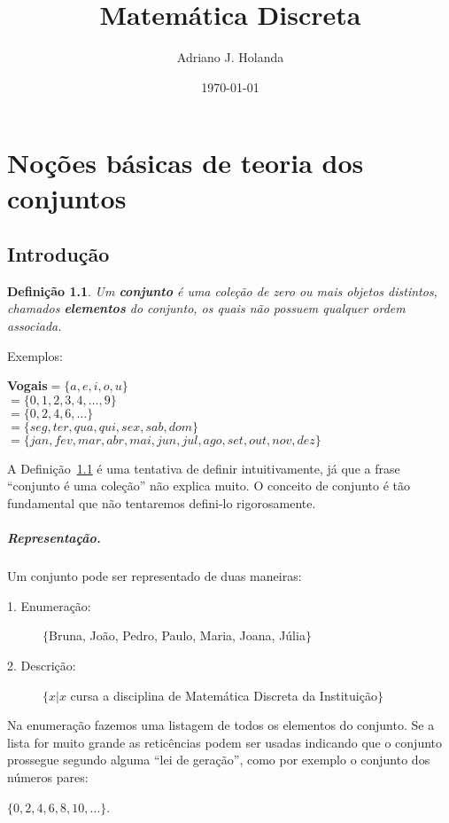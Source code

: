 \documentclass[twoside,a4wide,12pt]{book}
\author{Adriano J. Holanda}
\date{\today}
\title{Matemática Discreta}
\newtheorem{definition}{Definição}
\begin{document}
\chapter{Noções básicas de teoria dos conjuntos}

\section{Introdução}

\begin{definition}
  \label{def:set}
  Um {\bf conjunto\/} é uma coleção de zero ou mais objetos distintos,
  chamados {\bf elementos\/} do conjunto, os quais não possuem
  qualquer ordem associada.
\end{definition}


\noindent Exemplos:
\begin{tabbing}
\hspace{1cm}\={\bf Vogais}$=\{a,e,i,o,u\}$\\
$=\{0,1,2,3,4,\ldots,9\}$\\
$=\{0,2,4,6,\ldots\}$\\
$=\{seg,ter,qua,qui,sex,sab,dom\}$\\
$=\{jan,fev,mar,abr,mai,jun,jul,ago,set,out,nov,dez\}$
\end{tabbing}

A Definição~\ref{def:set} é uma tentativa de definir intuitivamente,
já que a frase ``conjunto é uma coleção'' não explica muito. O
conceito de conjunto é tão fundamental que não tentaremos defini-lo
rigorosamente.


\paragraph{Representação.} Um conjunto pode ser representado de duas
maneiras:

\begin{description}
\item[1. Enumeração:] $\{$Bruna, João, Pedro, Paulo, Maria, Joana, Júlia$\}$
\item[2. Descrição:] $\{x|x$ cursa a disciplina de Matemática Discreta
  da Instituição$\}$
\end{description}

Na enumeração fazemos uma listagem de todos os elementos do
conjunto. Se a lista for muito grande as reticências podem ser usadas
indicando que o conjunto prossegue segundo alguma ``lei de geração'',
como por exemplo o conjunto dos números pares:
\begin{center}
  $\{0,2,4,6,8,10,\ldots\}$.
\end{center}
\end{document}
